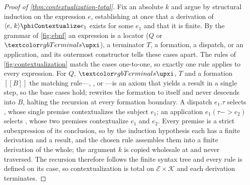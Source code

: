 
\begin{proof}[Proof of \cref{thm:contextualization-total}]
Fix an absolute \(k\) and argue by structural induction on the expression \(e\),
  establishing at once that a derivation of \(\phinoContextualize{e}{k}{e_1}\)
  exists for some \(e_1\) and that it is finite.
By the grammar of \cref{fig:ebnf} an expression is a locator ($Q$ or
  \(\phiTerminal{\upxi}\)), a terminator $T$, a formation, a dispatch, or an
  application, and its outermost constructor tells these cases apart.
The rules of \cref{fig:contextualization} match the cases one-to-one, so exactly
  one rule applies to every expression.
For $Q$, \(\phiTerminal{\upxi}\), $T$ and a formation $[[ B ]]$
  the matching rule---, ,  or
  ---is an axiom that yields a result in a single step, so the base
  cases hold;  rewrites the formation to itself and never descends
  into \(B\), halting the recursion at every formation boundary.
A dispatch $e_1.\tau$ selects , whose single premise
  contextualizes the subject \(e_1\); an application $e_1( \tau -> e_2 )$ selects , whose two premises
  contextualize \(e_1\) and \(e_2\).
Every premise is a strict subexpression of its conclusion, so by the induction
  hypothesis each has a finite derivation and a result, and the chosen rule
  assembles them into a finite derivation of the whole; the argument \(k\) is
  copied wholesale at  and never traversed.
The recursion therefore follows the finite syntax tree and every rule is defined
  on its case, so contextualization is total on \(\mathcal{E} \times \mathcal{K}\)
  and each derivation terminates.
\end{proof}
